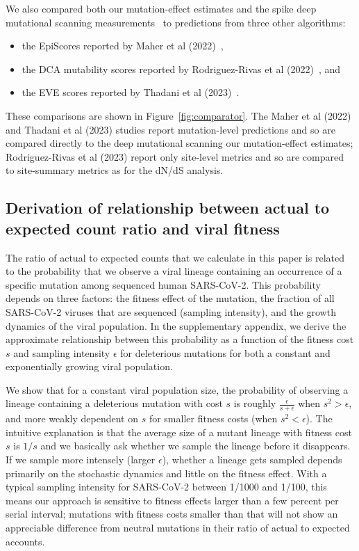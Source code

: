 \documentclass[9pt,twocolumn,twoside]{gsajnl_modified}
\begin{document}
{We also compared both our mutation-effect estimates and the spike deep mutational scanning measurements~\citep{dadonaite2023pseudovirus} to predictions from three other algorithms:
\begin{itemize}
\item the EpiScores reported by Maher et al (2022)~\cite{maher2022predicting},
\item the DCA mutability scores reported by Rodriguez-Rivas et al (2022)~\cite{rodriguez2022epistatic}, and
\item the EVE scores reported by Thadani et al (2023)~\cite{thadani2022learning}.
\end{itemize}
These comparisons are shown in Figure~\ref{fig:comparator}.
The Maher et al (2022) and Thadani et al (2023) studies report mutation-level predictions and so are compared directly to the deep mutational scanning our mutation-effect estimates; Rodriguez-Rivas et al (2023) report only site-level metrics and so are compared to site-summary metrics as for the dN/dS analysis.

\subsection{Derivation of relationship between actual to expected count ratio and viral fitness}
The ratio of actual to expected counts that we calculate in this paper is related to the probability that we observe a viral lineage containing an occurrence of a specific mutation among sequenced human SARS-CoV-2.
This probability depends on three factors: the fitness effect of the mutation, the fraction of all SARS-CoV-2 viruses that are sequenced (sampling intensity), and the growth dynamics of the viral population.
In the supplementary appendix, we derive the approximate relationship between this probability as a function of the fitness cost $s$ and sampling intensity $\epsilon$ for deleterious mutations for both a constant and exponentially growing viral population.

We show that for a constant viral population size, the probability of observing a lineage containing a deleterious mutation with cost $s$ is roughly $\frac{\epsilon}{s + \epsilon}$ when $s^2 > \epsilon$, and more weakly dependent on $s$ for smaller fitness costs (when $s^2 < \epsilon$).
The intuitive explanation is that the average size of a mutant lineage with fitness cost $s$ is $1/s$ and we basically ask whether we sample the lineage before it disappears.
If we sample more intensely (larger $\epsilon$), whether a lineage gets sampled depends primarily on the stochastic dynamics and little on the fitness effect.
With a typical sampling intensity for SARS-CoV-2 between 1/1000 and 1/100, this means our approach is sensitive to fitness effects larger than a few percent per serial interval; mutations with fitness costs smaller than that will not show an appreciable difference from neutral mutations in their ratio of actual to expected accounts.

}
\end{document}
